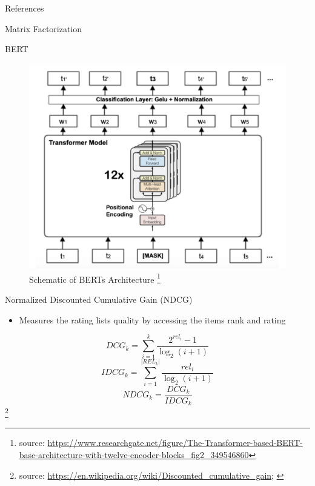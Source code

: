 \documentclass[en]{sdqbeamer}
\newcommand\blfootnote[1]{%
  \begingroup
  \renewcommand\thefootnote{}\footnote{#1}%
  \addtocounter{footnote}{-1}%
  \endgroup
}
\begin{document}
\appendix
\beginbackup
\begin{frame}{References}
	\printbibliography
\end{frame}

\begin{frame}{Matrix Factorization}
	
\end{frame}

\begin{frame}{BERT}
	\begin{figure}
		\includegraphics[height=0.5\textheight]{images/The-Transformer-based-BERT-base-architecture-with-twelve-encoder-blocks.pdf}
		\caption{Schematic of BERTs Architecture \footnote{source: \href{https://www.researchgate.net/figure/The-Transformer-based-BERT-base-architecture-with-twelve-encoder-blocks\_fig2\_349546860}{https://www.researchgate.net/figure/The-Transformer-based-BERT-base-architecture-with-twelve-encoder-blocks\_fig2\_349546860}}}
	\end{figure}
	
\end{frame}

\begin{frame}{Normalized Discounted Cumulative Gain (NDCG)}
	\begin{itemize}
		\item Measures the rating lists quality by accessing the items rank and rating
	\end{itemize}
	$$DCG_k = \sum_{i=1}^{k}\frac{2^{rel_i} - 1}{\log_2(i+1)}$$
	$$IDCG_k = \sum_{i=1}^{|REL_k|}\frac{rel_i}{\log_2(i+1)}$$
	$$NDCG_k = \frac{DCG_k}{IDCG_k}$$
	\blfootnote{source: \href{https://en.wikipedia.org/wiki/Discounted\_cumulative\_gain}{https://en.wikipedia.org/wiki/Discounted\_cumulative\_gain}; \cite{channarongHybridBERT4RecHybridContentBased2022}}
	
\end{frame}
\backupend
\end{document}
